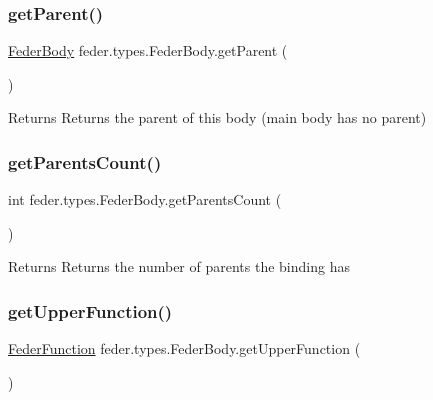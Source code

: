\subsubsection{\texorpdfstring{get\+Parent()}{getParent()}}
{\footnotesize\ttfamily \hyperlink{classfeder_1_1types_1_1FederBody}{Feder\+Body} feder.\+types.\+Feder\+Body.\+get\+Parent (\begin{DoxyParamCaption}{ }\end{DoxyParamCaption})}

\begin{DoxyReturn}{Returns}
Returns the parent of this body (main body has no parent) 
\end{DoxyReturn}
\mbox{\label{classfeder_1_1types_1_1FederBody_a578373bc7ed4a41102f7bf8ef1aa1c88}} 
\subsubsection{\texorpdfstring{get\+Parents\+Count()}{getParentsCount()}}
{\footnotesize\ttfamily int feder.\+types.\+Feder\+Body.\+get\+Parents\+Count (\begin{DoxyParamCaption}{ }\end{DoxyParamCaption})}

\begin{DoxyReturn}{Returns}
Returns the number of parents the binding has 
\end{DoxyReturn}
\mbox{\label{classfeder_1_1types_1_1FederBody_a95db3cb467da96aec741f286042e7bbc}} 
\subsubsection{\texorpdfstring{get\+Upper\+Function()}{getUpperFunction()}}
{\footnotesize\ttfamily \hyperlink{classfeder_1_1types_1_1FederFunction}{Feder\+Function} feder.\+types.\+Feder\+Body.\+get\+Upper\+Function (\begin{DoxyParamCaption}{ }\end{DoxyParamCaption})}

